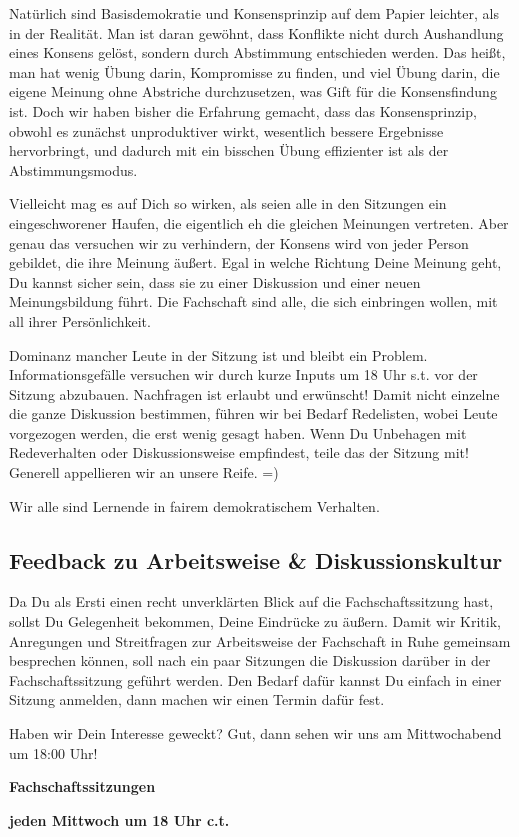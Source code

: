 Natürlich sind Basisdemokratie und Konsensprinzip auf dem Papier leichter, als in der Realität. Man ist daran gewöhnt, dass Konflikte nicht durch Aushandlung eines Konsens gelöst, sondern durch Abstimmung entschieden werden. Das heißt, man hat wenig Übung darin, Kompromisse zu finden, und viel Übung darin, die eigene Meinung ohne Abstriche durchzusetzen, was Gift für die Konsensfindung ist. Doch wir haben bisher die Erfahrung gemacht, dass das Konsensprinzip, obwohl es zunächst unproduktiver wirkt, wesentlich bessere Ergebnisse hervorbringt, und dadurch mit ein bisschen Übung effizienter ist als der Abstimmungsmodus.

Vielleicht mag es auf Dich so wirken, als seien alle in den Sitzungen ein eingeschworener Haufen, die eigentlich eh die gleichen Meinungen vertreten. Aber genau das versuchen wir zu verhindern, der Konsens wird von jeder Person gebildet, die ihre Meinung äußert. Egal in welche Richtung Deine Meinung geht, Du kannst sicher sein, dass sie zu einer Diskussion und einer neuen Meinungsbildung führt. Die Fachschaft sind alle, die sich einbringen wollen, mit all ihrer Persönlichkeit.

Dominanz mancher Leute in der Sitzung ist und bleibt ein Problem. Informationsgefälle versuchen wir durch kurze Inputs um 18 Uhr \gls{s.t.} vor der Sitzung abzubauen. Nachfragen ist erlaubt und erwünscht! Damit nicht einzelne die ganze Diskussion bestimmen, führen wir bei Bedarf Redelisten, wobei Leute vorgezogen werden, die erst wenig gesagt haben. Wenn Du Unbehagen mit Redeverhalten oder Diskussionsweise empfindest, teile das der Sitzung mit! Generell appellieren wir an unsere Reife. =)

Wir alle sind Lernende in fairem demokratischem Verhalten.

\subsection*{Feedback zu Arbeitsweise \& Diskussionskultur}

Da Du als Ersti einen recht unverklärten Blick auf die Fachschaftssitzung hast, sollst Du Gelegenheit bekommen, Deine Eindrücke zu äußern. Damit wir Kritik, Anregungen und Streitfragen zur Arbeitsweise der Fachschaft in Ruhe gemeinsam besprechen können, soll nach ein paar Sitzungen die Diskussion darüber in der Fachschaftssitzung geführt werden. Den Bedarf dafür kannst Du einfach in einer Sitzung anmelden, dann machen wir einen Termin dafür fest.

Haben wir Dein Interesse geweckt? Gut, dann sehen wir uns am Mittwochabend um 18:00 Uhr!

\begin{center}
\large
\textbf{Fachschaftssitzungen}

\textbf{jeden Mittwoch um 18 Uhr \gls{c.t.}}
\end{center}

